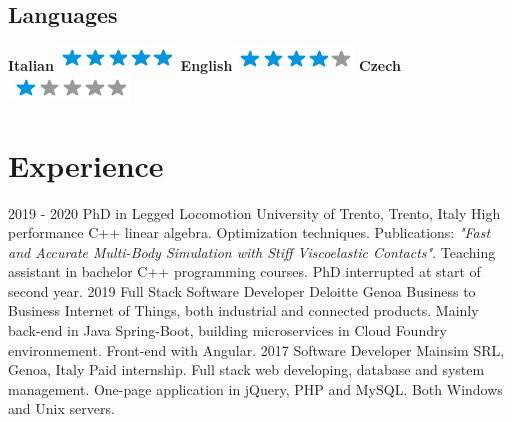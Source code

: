 \documentclass[]{friggeri-cv}
\begin{document}
\begin{aside}
  \section{Languages}
    \textbf{Italian}\includegraphics[scale=0.40]{img/5stars.png}
    \textbf{English}\includegraphics[scale=0.40]{img/4stars.png}
    \textbf{Czech}\includegraphics[scale=0.40]{img/1stars.png}    
\end{aside}

\section{Experience}
\begin{entrylist}
  \entry
	{2019 - 2020}
	{PhD in Legged Locomotion}
	{University of Trento, Trento, Italy}
	{High performance C++ linear algebra. Optimization techniques. Publications: \textit{"Fast and Accurate Multi-Body Simulation with Stiff Viscoelastic Contacts"}. Teaching assistant in bachelor C++ programming courses. PhD interrupted at start of second year.}
  \entry
	{2019}
	{Full Stack Software Developer}
	{Deloitte Genoa}
	{Business to Business Internet of Things, both industrial and connected products. Mainly back-end in Java Spring-Boot, building microservices in Cloud Foundry environnement. Front-end with Angular. }
  \entry
    {2017}
    {Software Developer}
    {Mainsim SRL, Genoa, Italy}
    {Paid internship. Full stack web developing, database and system management. One-page application in jQuery, PHP and MySQL. Both Windows and Unix servers.}
\end{entrylist}
\end{document}
